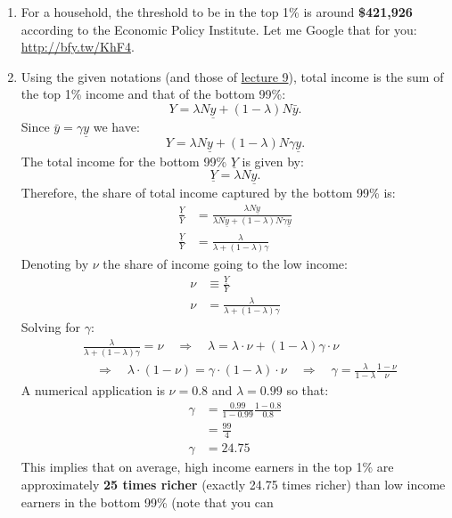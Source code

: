 \documentclass[]{book}
\begin{document}
\begin{enumerate}
\def\labelenumi{\arabic{enumi}.}
\item
  For a household, the threshold to be in the top 1\% is around
  \textbf{\$421,926} according to the Economic Policy Institute. Let me
  Google that for you: \url{http://bfy.tw/KhF4}.
\item
  Using the given notations (and those of
  \protect\hyperlink{redistributive}{lecture 9}), total income is the
  sum of the top 1\% income and that of the bottom 99\%:
  \[Y=\lambda N \underline{y}+(1-\lambda) N \bar{y}.\] Since
  \(\bar{y}=\gamma \underline{y}\) we have:
  \[Y=\lambda N \underline{y}+(1-\lambda) N \gamma \underline{y}.\] The
  total income for the bottom 99\% \(\underline{Y}\) is given by:
  \[\underline{Y}=\lambda N \underline{y}.\] Therefore, the share of
  total income captured by the bottom 99\% is: \[
  \begin{aligned}
  \frac{\underline{Y}}{Y}&=\frac{\lambda N \underline{y}}{\lambda N \underline{y}+(1-\lambda) N \gamma \underline{y}}\\
  \frac{\underline{Y}}{Y}&=\frac{\lambda}{\lambda +(1-\lambda) \gamma}
  \end{aligned}
  \] Denoting by \(\nu\) the share of income going to the low income: \[
  \begin{aligned}
  \nu &\equiv \frac{\underline{Y}}{Y}\\
  \nu &=\frac{\lambda}{\lambda +(1-\lambda) \gamma}
  \end{aligned}
  \] Solving for \(\gamma\): \[
  \begin{aligned}
  & \frac{\lambda}{\lambda +(1-\lambda) \gamma} = \nu \quad \Rightarrow \quad  \lambda  = \lambda \cdot\nu + (1-\lambda)\gamma \cdot \nu \\
  & \quad \Rightarrow \quad \lambda \cdot (1-\nu)=\gamma \cdot (1-\lambda) \cdot \nu \quad \Rightarrow \quad \boxed{\gamma = \frac{\lambda}{1-\lambda}\frac{1-\nu}{\nu}}
  \end{aligned}
  \] A numerical application is \(\nu=0.8\) and \(\lambda = 0.99\) so
  that: \[
  \begin{aligned}
  \gamma &= \frac{0.99}{1-0.99}\frac{1-0.8}{0.8}\\
   &= \frac{99}{4} \\
  \gamma &= 24.75
  \end{aligned}
  \] This implies that on average, high income earners in the top 1\%
  are approximately \textbf{25 times richer} (exactly 24.75 times
  richer) than low income earners in the bottom 99\% (note that you can

\end{enumerate}
\end{document}
